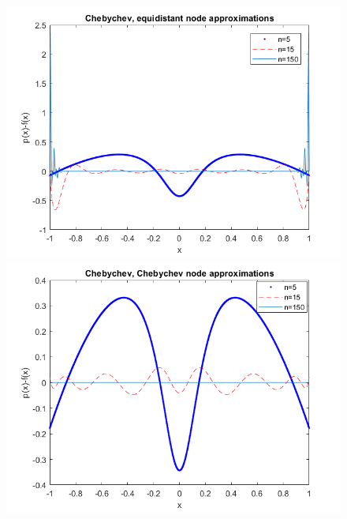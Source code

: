 \documentclass{article}
\begin{document}
	\begin{figure}[h]
	\begin{minipage}{0.56\textwidth}
	  \includegraphics[width = \textwidth, keepaspectratio]{chebequi.png}
    \end{minipage}
    \begin{minipage}{0.56\textwidth}
	  \includegraphics[width = \textwidth, keepaspectratio]{chebcheb.png}
    \end{minipage}
    \begin{minipage}{0.56\textwidth}

\end{minipage}
\end{figure}
\end{document}
